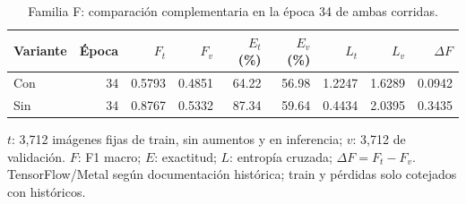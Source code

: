 \begin{table}[htbp]
\centering
\small
\caption{Familia F: comparación complementaria en la época 34 de ambas corridas.}
\label{tab:regularizacion_epoca34}
\begin{tabular}{lrrrrrrrr}
\toprule
Variante & Época & $F_t$ & $F_v$ & $E_t$(\%) & $E_v$(\%) & $L_t$ & $L_v$ & $\Delta F$ \\
\midrule
Con & 34 & 0.5793 & 0.4851 & 64.22 & 56.98 & 1.2247 & 1.6289 & 0.0942 \\
Sin & 34 & 0.8767 & 0.5332 & 87.34 & 59.64 & 0.4434 & 2.0395 & 0.3435 \\
\bottomrule
\end{tabular}
\par\smallskip
\parbox{0.97\textwidth}{\footnotesize $t$: 3,712 imágenes fijas de train, sin aumentos y en inferencia; $v$: 3,712 de validación. $F$: F1 macro; $E$: exactitud; $L$: entropía cruzada; $\Delta F=F_t-F_v$. TensorFlow/Metal según documentación histórica; train y pérdidas solo cotejados con históricos.}
\end{table}
